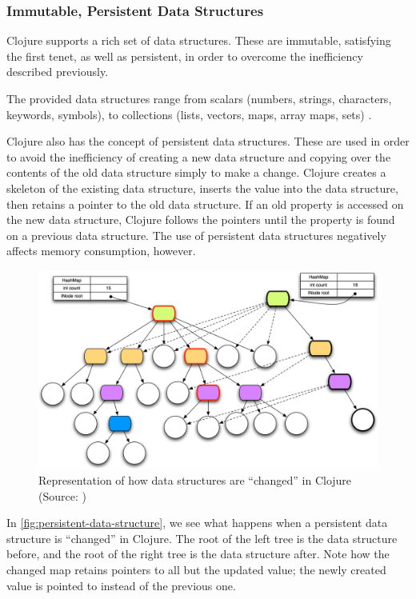 		\subsubsection{Immutable, Persistent Data Structures}
			Clojure supports a rich set of data structures.  These are immutable, satisfying the first tenet, as well as persistent, in order to overcome the inefficiency described previously.
			
			The provided data structures range from scalars (numbers, strings, characters, keywords, symbols), to collections (lists, vectors, maps, array maps, sets) \cite{clj-data-structures}.
			
			Clojure also has the concept of persistent data structures.  These are used in order to avoid the inefficiency of creating a new data structure and copying over the contents of the old data structure simply to make a change.  Clojure creates a skeleton of the existing data structure, inserts the value into the data structure, then retains a pointer to the old data structure.  If an old property is accessed on the new data structure, Clojure follows the pointers until the property is found on a previous data structure.  The use of persistent data structures negatively affects memory consumption, however.
			
			\begin{figure}
				\centering
				
				\includegraphics[scale=0.42]{figures/diagrams/persistent-data-structure}
				
				\caption{Representation of how data structures are ``changed'' in Clojure (Source:  \cite{clj-persistent})}
				\label{fig:persistent-data-structure}
			\end{figure}
			
			In \vref{fig:persistent-data-structure}, we see what happens when a persistent data structure is ``changed'' in Clojure.  The root of the left tree is the data structure before, and the root of the right tree is the data structure after.  Note how the changed map retains pointers to all but the updated value; the newly created value is pointed to instead of the previous one.
		
